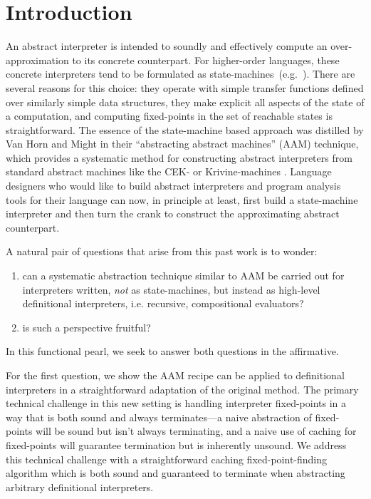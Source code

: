 \section{Introduction}

An abstract interpreter is intended to soundly and effectively compute
an over-approximation to its concrete counterpart.  For higher-order
languages, these concrete interpreters tend to be formulated as
state-machines~(e.g.~\cite{dvanhorn:jagannathan-weeks-popl95,
  dvanhorn:jagannathan-etal-popl98, 
  dvanhorn:wright-jagannathan-toplas98,
  dvanhorn:Might:2006:DeltaCFA,
  dvanhorn:midtgaard-jensen-sas-08,
  dvanhorn:Midtgaard2009Controlflow,
  dvanhorn:Might2011Family, dvanhorn:Sergey2013Monadic}).  There are
several reasons for this choice: they operate with simple transfer
functions defined over similarly simple data structures, they make
explicit all aspects of the state of a computation, and computing
fixed-points in the set of reachable states is straightforward.
%
The essence of the state-machine based approach was distilled by Van
Horn and Might in their ``abstracting abstract machines'' (AAM)
technique, which provides a systematic method for constructing
abstract interpreters from standard abstract machines like the CEK- or
Krivine-machines \cite{dvanhorn:VanHorn2010Abstracting}.  Language
designers who would like to build abstract interpreters and program
analysis tools for their language can now, in principle at least,
first build a state-machine interpreter and then turn the crank to
construct the approximating abstract counterpart.

A natural pair of questions that arise from this past work is to
wonder:
\begin{enumerate}
  \item can a systematic abstraction technique similar to AAM  be
carried out for interpreters written, \emph{not} as state-machines,
but instead as high-level definitional interpreters, i.e. recursive,
compositional evaluators?
\item  is such a perspective fruitful?
\end{enumerate}
In this functional pearl, we seek to answer both questions in the
affirmative.

For the first question, we show the AAM recipe can be applied
to definitional interpreters in a straightforward adaptation of the
original method. The primary technical challenge in this new setting
is handling interpreter fixed-points in a way that is both sound and
always terminates---a naive abstraction of fixed-points will be sound but
isn't always terminating, and a naive use of caching for fixed-points
will guarantee termination but is inherently unsound. We address this
technical challenge with a straightforward caching fixed-point-finding
algorithm which is both sound and guaranteed to terminate when abstracting
arbitrary definitional interpreters.

